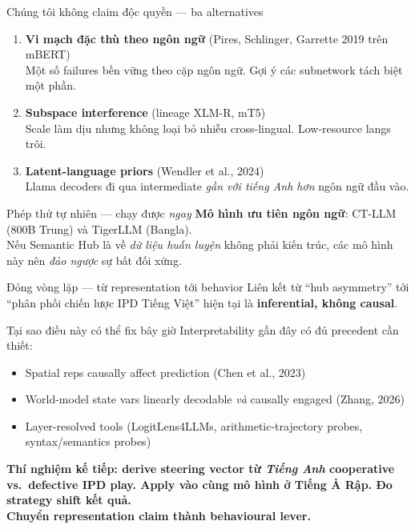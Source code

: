 \documentclass[11pt,aspectratio=169]{beamer}
\newcommand{\takeaway}[1]{%
  \begin{center}
    \colorbox{rsnavy!10}{%
      \begin{minipage}{0.92\textwidth}
        \centering\textbf{#1}
      \end{minipage}}
  \end{center}}
\begin{document}
\begin{frame}{Chúng tôi không claim độc quyền --- ba alternatives}
    \large
    \begin{enumerate}
        \setlength\itemsep{0.5em}
        \item \textbf{Vi mạch đặc thù theo ngôn ngữ} \scriptsize (Pires, Schlinger, Garrette 2019 trên mBERT)\\
        \normalsize Một số failures bền vững theo cặp ngôn ngữ. Gợi ý các subnetwork tách biệt một phần.
        \item \textbf{Subspace interference} \scriptsize (lineage XLM-R, mT5)\\
        \normalsize Scale làm dịu nhưng không loại bỏ nhiễu cross-lingual. Low-resource langs trôi.
        \item \textbf{Latent-language priors} \scriptsize (Wendler et al., 2024)\\
        \normalsize Llama decoders đi qua intermediate \emph{gần với tiếng Anh hơn} ngôn ngữ đầu vào.
    \end{enumerate}
    \vspace{0.3cm}
    \begin{block}{Phép thử tự nhiên --- chạy được \emph{ngay}}
        \textbf{Mô hình ưu tiên ngôn ngữ}: CT-LLM (800B Trung) và TigerLLM (Bangla).\\[4pt]
        Nếu Semantic Hub là về \emph{dữ liệu huấn luyện} không phải kiến trúc, các mô hình này nên \emph{đảo ngược} sự bất đối xứng.
    \end{block}
\end{frame}

\begin{frame}{Đóng vòng lặp --- từ representation tới behavior}
    \large
    Liên kết từ ``hub asymmetry'' tới ``phân phối chiến lược IPD Tiếng Việt'' hiện tại là \textbf{inferential, không causal}.
    \vspace{0.3cm}
    \begin{block}{Tại sao điều này có thể fix bây giờ}
        Interpretability gần đây có đủ precedent cần thiết:
        \begin{itemize}
            \setlength\itemsep{0.2em}
            \item Spatial reps causally affect prediction \scriptsize (Chen et al., 2023)
            \item World-model state vars linearly decodable \emph{và} causally engaged \scriptsize (Zhang, 2026)
            \item Layer-resolved tools (LogitLens4LLMs, arithmetic-trajectory probes, syntax/semantics probes)
        \end{itemize}
    \end{block}
    \vspace{0.3cm}
    \takeaway{Thí nghiệm kế tiếp: derive steering vector từ \emph{Tiếng Anh} cooperative vs.\ defective IPD play. Apply vào cùng mô hình ở Tiếng Ả Rập. Đo strategy shift kết quả.\\Chuyển representation claim thành behavioural lever.}
\end{frame}
\end{document}
